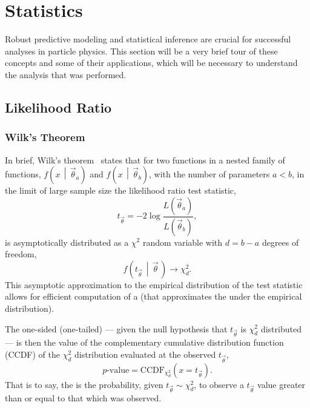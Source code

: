 \section{Statistics}\label{section:statistics}

Robust predictive modeling and statistical inference are crucial for successful analyses in particle physics.
This section will be a very brief tour of these concepts and some of their applications, which will be necessary to understand the analysis that was performed.

\subsection{Likelihood Ratio}\label{section:likelihood_ratio}

\subsubsection{Wilk's Theorem}\label{subsection:wilks_theorem}

In brief, Wilk's theorem~\cite{Wilks:1938dza} states that for two functions in a nested family of functions, $f\left(x\,\middle|\,\vec{\theta}_{a}\right)$ and $f\left(x\,\middle|\,\vec{\theta}_{b}\right)$, with the number of parameters $a < b$, in the limit of large sample size the likelihood ratio test statistic,
\begin{equation}
 t_{\vec{\theta}} = -2 \log \frac{\displaystyle L\left(\vec{\theta}_{a}\right)}{\displaystyle L\left(\vec{\theta}_{b}\right)},
\end{equation}
is asymptotically distributed as a $\chi^2$ random variable with $d=b-a$ degrees of freedom,
\begin{equation}
 f\left(t_{\vec{\theta}} \,\middle|\,\vec{\theta}\, \right) \to \chi^2_{d}.\label{eq:wilks_theorem}
\end{equation}
This asymptotic approximation to the empirical distribution of the test statistic allows for efficient computation of a \pvalue{} (that approximates the \pvalue{} under the empirical distribution).

The one-sided (one-tailed) \pvalue{} --- given the null hypothesis that $t_{\vec{\theta}}$ is $\chi_{d}^{2}$ distributed --- is then the value of the complementary cumulative distribution function (CCDF) of the $\chi^2_{d}$ distribution evaluated at the observed $t_{\vec{\theta}}$,
\begin{equation}
 p\textrm{-value} = \textrm{CCDF}_{\chi^2_{d}}\left(x=t_{\vec{\theta}}\right).
\end{equation}
That is to say, the \pvalue{} is the probability, given $t_{\vec{\theta}} \sim \chi^2_{d}$, to observe a $t_{\vec{\theta}}$ value greater than or equal to that which was observed.

